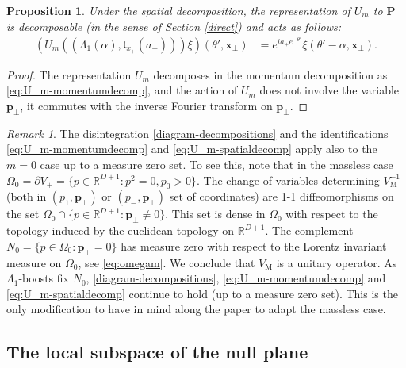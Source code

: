 \documentclass[12pt]{article}
\def\RR{{\mathbb R}}
\def\tp{\pmb{p}}
\newtheorem{proposition}[theorem]{Proposition}
\theoremstyle{remark}
\newtheorem{remark}[theorem]{Remark}
\begin{document}
 \begin{proposition}\label{spatial-decomp-P}
 Under the spatial decomposition, the representation of $U_m$ to $\mathbf{P}$ is decomposable (in the sense of Section \ref{direct})
 and acts as follows:
    \begin{align}\label{eq:U_m-spatialdecomp}
    (U_m((\Lambda_{1}(\alpha),\mathfrak{t}_{x_+}(a_+)))\xi)(\theta',\pmb{x}_\perp) &=
    e^{ia_+e^{-\theta'}}\xi(\theta'-\alpha, \pmb{x}_\perp).
   \end{align}
 \end{proposition}
 \begin{proof}
  The representation $U_m$ decomposes in the momentum decomposition as \eqref{eq:U_m-momentumdecomp},
  and the action of $U_m$ does not involve the variable $\tp_\perp$,
  it commutes with the inverse Fourier transform on $\tp_\perp$.
 \end{proof}

\begin{remark}\label{rem:massless} The disintegration \eqref{diagram-decompositions} and the identifications \eqref{eq:U_m-momentumdecomp} and \eqref{eq:U_m-spatialdecomp} apply also to the $m=0$ case up to a measure zero set. 
To see this, note that in the massless case $\Omega_0=\partial V_+=\{p\in\RR^{D+1}: p^2=0,p_0>0\}$. The change of variables determining  $V_{\mathrm M}^{-1}$ (both in $(p_1,\tp_\perp)$ or $(p_-,\tp_\perp)$ set of coordinates) are 1-1 diffeomorphisms on the set $\Omega_0\cap\{p\in\RR^{D+1}: \tp_\perp\neq 0\}$. This set is dense in $\Omega_0$ with respect to the topology induced by the euclidean topology on $\RR^{D+1}$. The complement   $N_0=\{p\in\Omega_0:\tp_\perp= 0\}$ has measure zero
with respect to  the Lorentz invariant measure on $\Omega_0$, see \eqref{eq:omegam}.  We conclude that $V_{\mathrm M}$ is a  unitary operator.
As $\Lambda_{1}$-boosts  fix $N_0$,
\eqref{diagram-decompositions}, \eqref{eq:U_m-momentumdecomp} and \eqref{eq:U_m-spatialdecomp} continue to hold (up to a measure zero set).
This is the only modification to have in mind along the paper to adapt the massless case.
 \end{remark}

\subsection{The local subspace of the null plane}\label{sec:local-subspace-of-null-plane}
\end{document}
